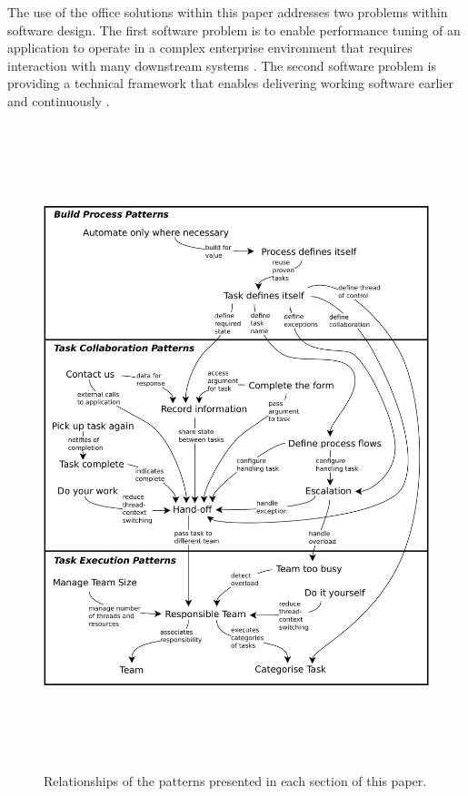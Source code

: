 \documentclass[prodmode]{style/acmlarge}
\begin{document}
The use of the office solutions within this paper addresses two problems within
software design.  The first software problem is to enable performance tuning of
an application to operate in a complex enterprise environment that requires
interaction with many downstream systems \cite{reverse-ten-k-problem}.  The
second software problem is providing a technical framework that enables
delivering working software earlier and continuously \cite{agile-manifesto}.

\begin{figure}[!t]
\centering
\includegraphics[height=7.4in]{PatternRelationships}
\caption{Relationships of the patterns presented in each section of this paper.}
\label{fig:PatternRelationships}
\end{figure}
\end{document}
